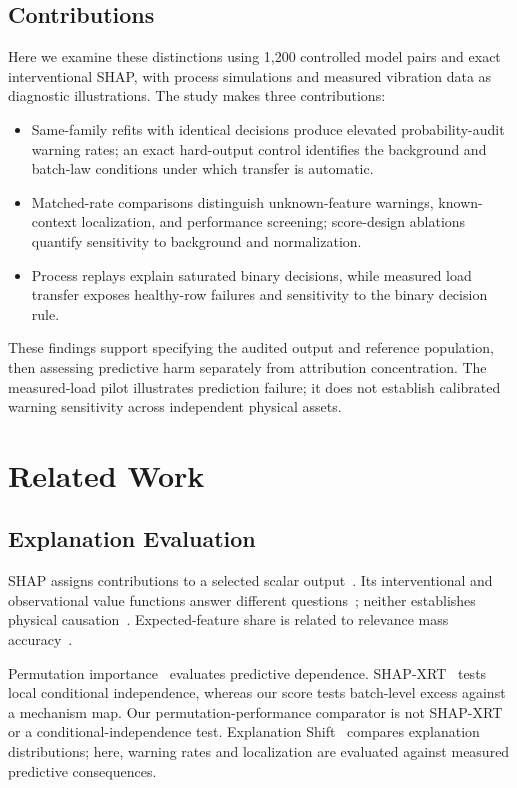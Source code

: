 \documentclass[conference]{IEEEtran}
\begin{document}
\subsection{Contributions}
Here we examine these distinctions using 1,200 controlled model pairs and exact interventional SHAP, with process simulations and measured vibration data as diagnostic illustrations. The study makes three contributions:
\begin{itemize}
\item Same-family refits with identical decisions produce elevated probability-audit warning rates; an exact hard-output control identifies the background and batch-law conditions under which transfer is automatic.
\item Matched-rate comparisons distinguish unknown-feature warnings, known-context localization, and performance screening; score-design ablations quantify sensitivity to background and normalization.
\item Process replays explain saturated binary decisions, while measured load transfer exposes healthy-row failures and sensitivity to the binary decision rule.
\end{itemize}
These findings support specifying the audited output and reference population, then assessing predictive harm separately from attribution concentration. The measured-load pilot illustrates prediction failure; it does not establish calibrated warning sensitivity across independent physical assets.

\section{Related Work}
\label{sec:background}
\subsection{Explanation Evaluation}
SHAP assigns contributions to a selected scalar output~\cite{lundberg2017shap}. Its interventional and observational value functions answer different questions~\cite{chen2020true,sundararajan2020many,janzing2020feature}; neither establishes physical causation~\cite{kumar2020problems}. Expected-feature share is related to relevance mass accuracy~\cite{arras2022clevr}.

Permutation importance~\cite{altmann2010permutation} evaluates predictive dependence. SHAP-XRT~\cite{teneggi2023shapxrt} tests local conditional independence, whereas our score tests batch-level excess against a mechanism map. Our permutation-performance comparator is not SHAP-XRT or a conditional-independence test. Explanation Shift~\cite{mougan2025shift} compares explanation distributions; here, warning rates and localization are evaluated against measured predictive consequences.
\end{document}
